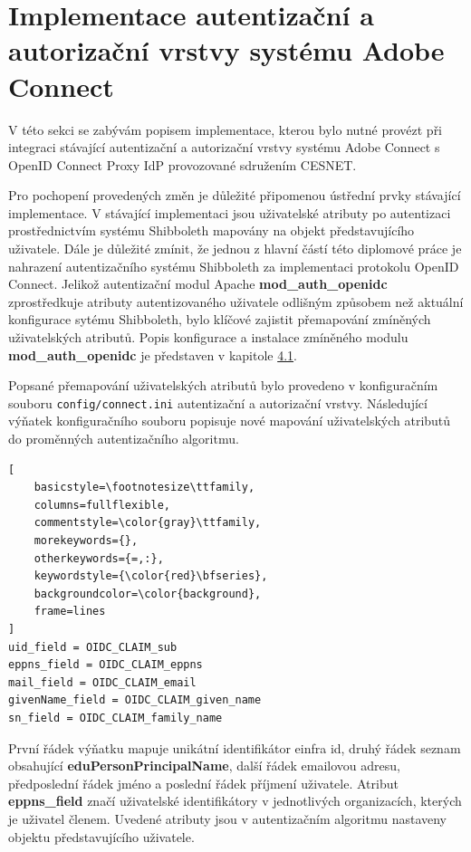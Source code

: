 \documentclass[
  printed, %
  twoside, %
  table,   %
  nolof,     %
  nolot,     %
]{fithesis3}
\begin{document}
\section{Implementace autentizační a autorizační vrstvy systému Adobe Connect}
\label{ACImpl}
V této sekci se zabývám popisem implementace, kterou bylo nutné provézt při integraci stávající autentizační a autorizační vrstvy systému Adobe Connect s OpenID Connect Proxy IdP provozované sdružením CESNET. 
\par 
Pro pochopení provedených změn je důležité připomenou ústřední prvky stávající implementace. V stávající implementaci jsou uživatelské atributy po autentizaci prostřednictvím systému Shibboleth mapovány na objekt představujícího uživatele. Dále je důležité zmínit, že jednou z hlavní částí této diplomové práce je nahrazení autentizačního systému Shibboleth za implementaci protokolu OpenID Connect. Jelikož autentizační modul Apache \textbf{mod\_auth\_openidc} zprostředkuje atributy autentizovaného uživatele odlišným způsobem než aktuální konfigurace sytému Shibboleth, bylo klíčové zajistit přemapování zmíněných uživatelských atributů. Popis konfigurace a instalace zmíněného modulu \textbf{mod\_auth\_openidc} je představen v kapitole \hyperref[apacheInstall]{4.1}.  
\par

Popsané přemapování uživatelských atributů bylo provedeno v konfiguračním souboru \texttt{config/connect.ini} autentizační a autorizační vrstvy. Následující výňatek konfiguračního souboru popisuje nové mapování uživatelských atributů do proměnných autentizačního algoritmu. 

\begin{lstlisting}[
    basicstyle=\footnotesize\ttfamily,
    columns=fullflexible,
    commentstyle=\color{gray}\ttfamily,
    morekeywords={},
    otherkeywords={=,:},
    keywordstyle={\color{red}\bfseries},
    backgroundcolor=\color{background},
    frame=lines
]
uid_field = OIDC_CLAIM_sub
eppns_field = OIDC_CLAIM_eppns
mail_field = OIDC_CLAIM_email
givenName_field = OIDC_CLAIM_given_name
sn_field = OIDC_CLAIM_family_name
\end{lstlisting}
První řádek výňatku mapuje unikátní identifikátor einfra id, druhý řádek seznam obsahující \textbf{eduPersonPrincipalName}, další řádek emailovou adresu, předposlední řádek jméno a poslední řádek příjmení uživatele. Atribut \textbf{eppns\_field} značí uživatelské identifikátory v jednotlivých organizacích, kterých je uživatel členem. Uvedené atributy jsou v autentizačním algoritmu nastaveny objektu představujícího uživatele. 
\par 
\end{document}
